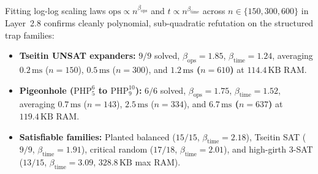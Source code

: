 \documentclass[11pt]{article}
\begin{document}
\begin{table}[!ht]
\centering
\caption{Cross-layer progression on the 140-instance parity suite ($n \le 60$) and 72-instance high-scale adversarial suite ($n \le 637$). Every Rust layer records $0$ false-SAT, $0$ false-UNSAT, and $0$ overflow events.}
\label{tab:progression}
\small
{}
\end{table}

Fitting log-log scaling laws $\text{ops} \propto n^{\beta_{\text{ops}}}$ and $t \propto n^{\beta_{\text{time}}}$ across $n \in \{150, 300, 600\}$ in Layer~2.8 confirms cleanly polynomial, sub-quadratic refutation on the structured trap families:
\begin{itemize}
  \item \textbf{Tseitin UNSAT expanders:} $9/9$ solved, $\beta_{\text{ops}} = 1.85$, $\beta_{\text{time}} = 1.24$, averaging $0.2\,\text{ms}$ ($n=150$), $0.5\,\text{ms}$ ($n=300$), and \textbf{$1.2\,\text{ms}$ ($n=610$)} at $114.4\,\text{KB}$ RAM.
  \item \textbf{Pigeonhole ($\mathrm{PHP}_5^6$ to $\mathrm{PHP}_9^{10}$):} $6/6$ solved, $\beta_{\text{ops}} = 1.75$, $\beta_{\text{time}} = 1.52$, averaging $0.7\,\text{ms}$ ($n=143$), $2.5\,\text{ms}$ ($n=334$), and \textbf{$6.7\,\text{ms}$ ($n=637$)} at $119.4\,\text{KB}$ RAM.
  \item \textbf{Satisfiable families:} Planted balanced ($15/15$, $\beta_{\text{time}} = 2.18$), Tseitin SAT ($9/9$, $\beta_{\text{time}} = 1.91$), critical random ($17/18$, $\beta_{\text{time}} = 2.01$), and high-girth 3-SAT ($13/15$, $\beta_{\text{time}} = 3.09$, $328.8\,\text{KB}$ max RAM).
\end{itemize}
\end{document}

